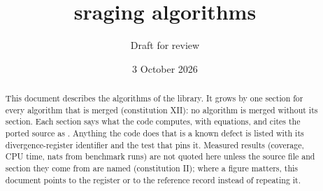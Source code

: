 \documentclass[11pt,a4paper]{article}
\title{sraging algorithms}
\author{Draft for review}
\date{3 October 2026}
\begin{document}
\sloppy
\maketitle

\begin{abstract}
\noindent This document describes the algorithms of the  library. It grows by one section for
every algorithm that is merged (constitution XII): no algorithm is merged without its section. Each section
says what the code computes, with equations, and cites the ported source as . Anything the
code does that is a known defect is listed with its divergence-register identifier and the test that pins it.
Measured results (coverage, CPU time, nats from benchmark runs) are not quoted here unless the source file
and section they come from are named (constitution II); where a figure matters, this document points to the
register or to the reference record instead of repeating it.
\end{abstract}

\tableofcontents
\clearpage














\end{document}
